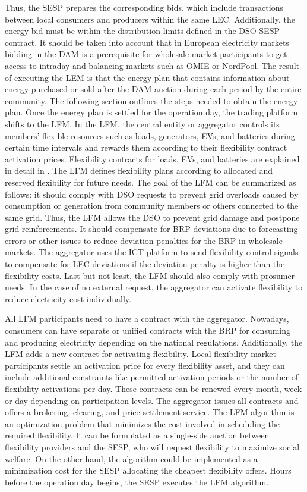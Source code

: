 Thus, the SESP prepares the corresponding bids, which include transactions between local consumers and producers within the same LEC.
Additionally, the energy bid must be within the distribution limits defined in the DSO-SESP contract. It should be taken into account that in European electricity markets bidding in the DAM is a prerequisite for wholesale market participants to get access to intraday and balancing markets such as OMIE or NordPool. The result of executing the LEM is that the energy plan that contains information about energy purchased or sold after the DAM auction during each period by the entire community. The following section outlines the steps needed to obtain the energy plan.
Once the energy plan is settled for the operation day, the trading platform shifts to the LFM. In the LFM, the central entity or aggregator controls its members' flexible resources such as loads, generators, EVs, and batteries during certain time intervals and rewards them according to their flexibility contract activation prices. Flexibility contracts for loads, EVs, and batteries are explained in detail in \cite{Olivella2018}. The LFM defines flexibility plans according to allocated and reserved flexibility for future needs. The goal of the LFM can be summarized as follows: it should comply with DSO requests to prevent grid overloads caused by consumption
or generation from community members or others connected to the same grid. Thus, the LFM allows the DSO to prevent grid damage and postpone grid reinforcements. It should compensate for BRP deviations due to forecasting errors or other issues to reduce deviation penalties for the BRP in wholesale markets. The aggregator uses the ICT platform to send flexibility control signals to compensate for LEC deviations if the deviation penalty is higher than the flexibility costs. Last but not least, the LFM should also comply with
prosumer needs. In the case of no external request, the aggregator can activate flexibility to reduce electricity cost individually.

All LFM participants need to have a contract with the aggregator. Nowadays, consumers can have separate or unified contracts with the BRP for consuming and producing electricity depending on the national regulations. Additionally, the LFM adds a new contract for activating flexibility. Local flexibility market participants settle an activation price for every flexibility asset, and they can include additional constraints like permitted activation periods or the number of flexibility activations per day. These contracts can be renewed every month, week or day depending on participation levels. The aggregator issues all contracts and offers a
brokering, clearing, and price settlement service. The LFM algorithm is an optimization problem that minimizes the cost involved in scheduling the required flexibility. It can be formulated as a single-side auction between flexibility providers and the SESP, who will request flexibility to maximize social welfare. On the other hand, the algorithm could be implemented as a minimization cost for the SESP allocating the cheapest flexibility offers. Hours before the operation day begins, the SESP executes the LFM algorithm.

